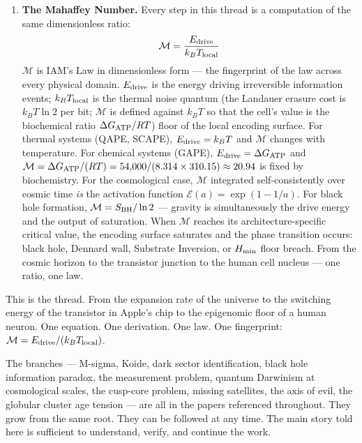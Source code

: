 \documentclass[12pt,a4paper]{article}
\begin{document}
\begin{enumerate}[leftmargin=1.5em,itemsep=0.3em]
\item \textbf{The Mahaffey Number.} Every step in this thread is a computation
of the same dimensionless ratio:
\begin{equation}
\mathcal{M} = \frac{E_{\rm drive}}{k_B T_{\rm local}}
\label{eq:mahaffey_number}
\end{equation}
$\mathcal{M}$ is IAM's Law in dimensionless form --- the fingerprint of the
law across every physical domain. $E_{\rm drive}$ is the energy driving
irreversible information events; $k_B T_{\rm local}$ is the thermal noise quantum (the Landauer erasure cost is $k_B T \ln 2$ per bit; $\mathcal{M}$ is defined against $k_B T$ so that the cell's value is the biochemical ratio $\Delta G_{\rm ATP}/RT$)
floor of the local encoding surface. For thermal systems (QAPE, SCAPE),
$E_{\rm drive} = k_BT$ and $\mathcal{M}$ changes with temperature. For
chemical systems (GAPE), $E_{\rm drive} = \Delta G_{\rm ATP}$ and
$\mathcal{M} = \Delta G_{\rm ATP}/(RT) = 54{,}000/(8.314\times310.15) \approx 20.94$ is fixed by biochemistry. For the cosmological
case, $\mathcal{M}$ integrated self-consistently over cosmic time \emph{is}
the activation function $\mathcal{E}(a) = \exp(1-1/a)$. For black hole
formation, $\mathcal{M} = S_{\rm BH}/\ln 2$ --- gravity is simultaneously
the drive energy and the output of saturation. When $\mathcal{M}$ reaches
its architecture-specific critical value, the encoding surface saturates
and the phase transition occurs: black hole, Dennard wall, Substrate
Inversion, or $H_{\rm min}$ floor breach. From the cosmic horizon to the
transistor junction to the human cell nucleus --- one ratio, one law.
\end{enumerate}

This is the thread. From the expansion rate of the universe to the switching
energy of the transistor in Apple's chip to the epigenomic floor of a
human neuron. One equation. One derivation. One law. One fingerprint:
$\mathcal{M} = E_{\rm drive}/(k_B T_{\rm local})$.

The branches --- M-sigma, Koide, dark sector identification, black hole
information paradox, the measurement problem, quantum Darwinism at cosmological
scales, the cusp-core problem, missing satellites, the axis of evil, the globular
cluster age tension --- are all in the papers referenced throughout. They grow
from the same root. They can be followed at any time. The main story told here
is sufficient to understand, verify, and continue the work.

\newpage
\end{document}
